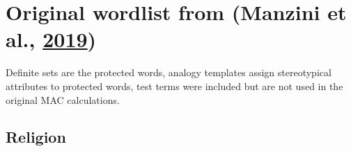 \documentclass[12pt,]{book}
\begin{document}
\section*{\texorpdfstring{Original wordlist from (Manzini et al.,
\protect\hyperlink{ref-Manzini2019blackToCriminal}{2019})}{Original wordlist from (Manzini et al., 2019)}}\label{original-wordlist-from-manzini2019blacktocriminal}

Definite sets are the protected words, analogy templates assign
stereotypical attributes to protected words, test terms were included
but are not used in the original MAC calculations.

\subsection*{Religion}\label{religion}

\vspace{1mm} \scriptsize
\end{document}
